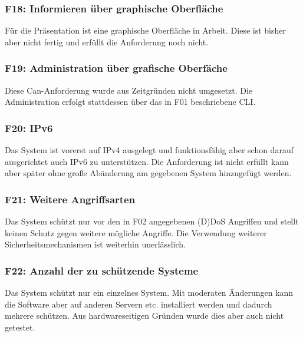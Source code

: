 \documentclass[../review_3.tex]{subfiles}
\begin{document}
\subsubsection{F18: Informieren über graphische Oberfläche}
Für die Präsentation ist eine graphische Oberfläche in Arbeit. Diese ist bisher aber nicht fertig und erfüllt die Anforderung noch nicht.

\subsubsection{F19: Administration über grafische Oberfäche}
Diese Can-Anforderung wurde aus Zeitgründen nicht umgesetzt. Die Administration erfolgt stattdessen über das in F01 beschriebene CLI.

\subsubsection{F20: IPv6}
Das System ist vorerst auf IPv4 ausgelegt und funktionsfähig aber schon darauf ausgerichtet auch IPv6 zu unterstützen. Die Anforderung ist nicht erfüllt kann aber später ohne große Abänderung am gegebenen System hinzugefügt werden. 

\subsubsection{F21: Weitere Angriffsarten}
Das System schützt nur vor den in F02 angegebenen (D)DoS Angriffen und stellt keinen Schutz gegen weitere mögliche Angriffe. Die Verwendung weiterer Sicherheitsmechanismen ist weiterhin unerlässlich.

\subsubsection{F22: Anzahl der zu schützende Systeme}
Das System schützt nur ein einzelnes System. Mit moderaten Änderungen kann die Software aber auf anderen Servern etc. installiert werden und dadurch mehrere schützen. Aus hardwareseitigen Gründen wurde dies aber auch nicht getestet.
\end{document}

